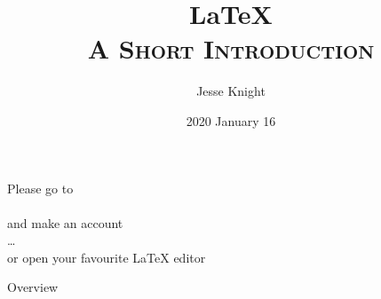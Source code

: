 \documentclass[11pt,aspectratio=169]{beamer}
\title[\LaTeX: A Short Introduction]{\LaTeX\\\textsc{\small{A Short Introduction}}}
\author[\href{\github}{\tiny\texttt{\github}} \hspace{0.3\linewidth} Jesse Knight]
{Jesse Knight}
\institute{University of Toronto\\Libraries}
\date{2020 January 16}
\begin{document}
\begin{frame}
  \centering\Large
  Please go to
  \\
  \href{https://www.overleaf.com}{}
  \\
  and make an account
  \\\dots\\
  or open your favourite \LaTeX{} editor
\end{frame}
\begin{frame}
  \maketitle
\end{frame}
\begin{frame}[label=overview]{Overview}
  \tableofcontents
\end{frame}
\end{document}
